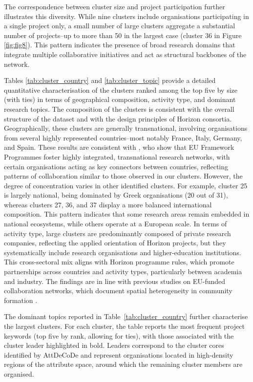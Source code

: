 \documentclass[11pt]{article}
\begin{document}
The correspondence between cluster size and project participation further illustrates this diversity. While nine clusters include organisations participating in a single project only, a small number of large clusters aggregate a substantial number of projects--up to more than 50 in the largest case (cluster 36 in Figure \ref{fig:fig8}). This pattern indicates the presence of broad research domains that integrate multiple collaborative initiatives and act as structural backbones of the network.

Tables \ref{tab:cluster_country} and \ref{tab:cluster_topic} provide a detailed quantitative characterisation of the clusters ranked among the top five by size (with ties) in terms of geographical composition, activity type, and dominant research topics. 
The composition of the clusters is consistent with the overall structure of the dataset and with the design principles of Horizon consortia. Geographically, these clusters are generally transnational, involving organisations from several highly represented countries--most notably France, Italy, Germany, and Spain. These results are consistent with \cite{Balland2019Network20032017}, who show that EU Framework Programmes foster highly integrated, transnational research networks, with certain organisations acting as key connectors between countries, reflecting patterns of collaboration similar to those observed in our clusters. However, the degree of concentration varies in other identified clusters. For example, cluster 25 is largely national, being dominated by Greek organisations (20 out of 31), whereas clusters 27, 36, and 37 display a more balanced international composition. This pattern indicates that some research areas remain embedded in national ecosystems, while others operate at a European scale. 
In terms of activity type, large clusters are predominantly composed of private research companies, reflecting the applied orientation of Horizon projects, but they systematically include research organisations and higher-education institutions. This cross-sectoral mix aligns with Horizon programme rules, which promote partnerships across countries and activity types, particularly between academia and industry. The findings are in line with previous studies on EU-funded collaboration networks, which document spatial heterogeneity in community formation \citep{barber2013community, Morea2024MappingAnalysis}.

The dominant topics reported in Table~\ref{tab:cluster_country} further characterise the largest clusters. For each cluster, the table reports the most frequent project keywords (top five by rank, allowing for ties), with those associated with the cluster leader highlighted in bold. Leaders correspond to the cluster cores identified by AttDeCoDe and represent organisations located in high-density regions of the attribute space, around which the remaining cluster members are organised.
\end{document}
